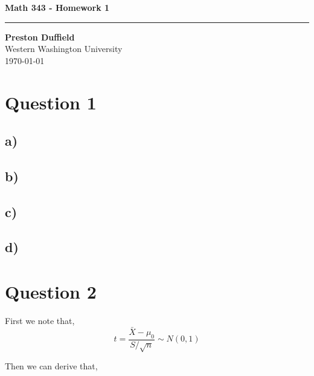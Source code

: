 \documentclass{article}
\begin{document}
\noindent
\begin{minipage}[t]{0.6\textwidth}
    \begin{flushleft}
        \LARGE\textbf{Math 343 - Homework 1} \\
        \vspace{6pt} %
        \hrule width 10cm
        \vspace{12pt}
        \large\textbf{Preston Duffield} \\
        \large Western Washington University \\
        \today
        \vspace{24pt}
    \end{flushleft}
\end{minipage}


\section*{Question 1}

\subsection*{a)}
\subsection*{b)}
\subsection*{c)}
\subsection*{d)}

\section*{Question 2}

First we note that,
\begin{equation*}
    t = \frac{\bar{X} - \mu_0}{S/\sqrt{n}} \sim N(0,1)
    \end{equation*}
\begin{flushleft}
Then we can derive that,
    \end{flushleft}
    
\end{document}
